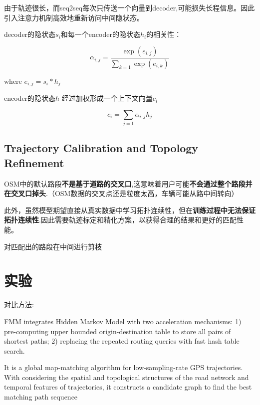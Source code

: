 由于轨迹很长，而seq2seq每次只传送一个向量到decoder,可能损失长程信息。因此引入注意力机制高效地重新访问中间隐状态。

decoder的隐状态$s_i$和每一个encoder的隐状态$h_i$的相关性：

\begin{equation} \alpha_{i, j}=\frac{\exp \left(e_{i, j}\right)}{\sum_{k=1} \exp \left(e_{i, k}\right)} \end{equation}

where $ e_{i, j}=s_{i} * h_{j} $

encoder的隐状态$h$ 经过加权形成一个上下文向量$c_i$

\begin{equation} c_{i}=\sum_{j=1} \alpha_{i, j} h_{j} \end{equation}

\subsection{Trajectory Calibration and Topology Refinement}

OSM中的默认路段\textbf{不是基于道路的交叉口},这意味着用户可能\textbf{不会通过整个路段并在交叉口掉头}.（OSM数据的交叉点还是粒度太高，车辆可能从路中间转向）

此外，虽然模型期望直接从真实数据中学习拓扑连续性，但在\textbf{训练过程中无法保证拓扑连续性}.因此需要轨迹标定和精化方案，以获得合理的结果和更好的匹配性能。

对匹配出的路段在中间进行剪枝

\section{实验}

对比方法:

\begin{definition}
    \cite{Yang2018} FMM integrates Hidden
Markov Model with two acceleration mechanisms: 1)
pre-computing upper bounded origin-destination table to
store all pairs of shortest paths; 2) replacing the repeated
routing queries with fast hash table search.
\end{definition}

\begin{definition}[ST Matching]
    \cite{Lou2009} It is a global map-matching algorithm
    for low-sampling-rate GPS trajectories. With considering
    the spatial and topological structures of the road network
    and temporal features of trajectories, it constructs a candidate
    graph to find the best matching path sequence
\end{definition}

